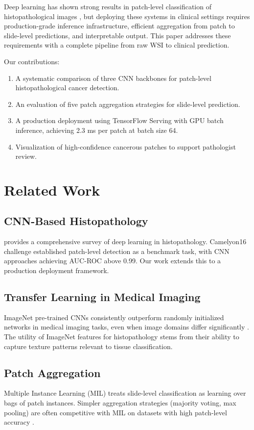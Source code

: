 \documentclass[conference]{IEEEtran}
\begin{document}
Deep learning has shown strong results in patch-level classification of histopathological images \cite{litjens2017survey}, but deploying these systems in clinical settings requires production-grade inference infrastructure, efficient aggregation from patch to slide-level predictions, and interpretable output. This paper addresses these requirements with a complete pipeline from raw WSI to clinical prediction.

Our contributions:
\begin{enumerate}
\item A systematic comparison of three CNN backbones for patch-level histopathological cancer detection.
\item An evaluation of five patch aggregation strategies for slide-level prediction.
\item A production deployment using TensorFlow Serving with GPU batch inference, achieving 2.3 ms per patch at batch size 64.
\item Visualization of high-confidence cancerous patches to support pathologist review.
\end{enumerate}

\section{Related Work}

\subsection{CNN-Based Histopathology}
\cite{litjens2017survey} provides a comprehensive survey of deep learning in histopathology. Camelyon16 challenge \cite{bejnordi2017diagnostic} established patch-level detection as a benchmark task, with CNN approaches achieving AUC-ROC above 0.99. Our work extends this to a production deployment framework.

\subsection{Transfer Learning in Medical Imaging}
ImageNet pre-trained CNNs consistently outperform randomly initialized networks in medical imaging tasks, even when image domains differ significantly \cite{raghu2019transfusion}. The utility of ImageNet features for histopathology stems from their ability to capture texture patterns relevant to tissue classification.

\subsection{Patch Aggregation}
Multiple Instance Learning (MIL) \cite{ilse2018attention} treats slide-level classification as learning over bags of patch instances. Simpler aggregation strategies (majority voting, max pooling) are often competitive with MIL on datasets with high patch-level accuracy \cite{campanella2019clinical}.
\end{document}
